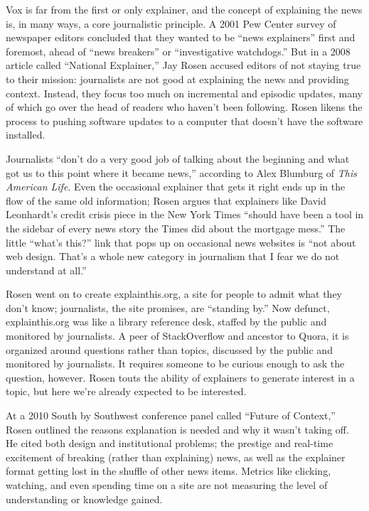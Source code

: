 Vox is far from the first or only explainer, and the concept of explaining the news is, in many ways, a core journalistic principle. A 2001 Pew Center survey of newspaper editors concluded that they wanted to be ``news explainers'' first and foremost, ahead of ``news breakers'' or ``investigative watchdogs.''\autocite{} But in a 2008 article called ``National Explainer,'' Jay Rosen accused editors of not staying true to their mission: journalists are not good at explaining the news and providing context.\autocite{} Instead, they focus too much on incremental and episodic updates, many of which go over the head of readers who haven't been following. Rosen likens the process to pushing software updates to a computer that doesn't have the software installed.

Journalists ``don’t do a very good job of talking about the beginning and what got us to this point where it became news,'' according to Alex Blumburg of \emph{This American Life}. Even the occasional explainer that gets it right ends up in the flow of the same old information; Rosen argues that explainers like David Leonhardt's credit crisis piece in the New York Times ``should have been a tool in the sidebar of every news story the Times did about the mortgage mess.'' The little ``what's this?'' link that pops up on occasional news websites is ``not about web design. That's a whole new category in journalism that I fear we do not understand at all.''

Rosen went on to create explainthis.org, a site for people to admit what they don't know; journalists, the site promises, are ``standing by.''\autocite{} Now defunct, explainthis.org was like a library reference desk, staffed by the public and monitored by journalists. A peer of StackOverflow and ancestor to Quora, it is organized around questions rather than topics, discussed by the public and monitored by journalists. It requires someone to be curious enough to ask the question, however. Rosen touts the ability of explainers to generate interest in a topic, but here we're already expected to be interested.

At a 2010 South by Southwest conference panel called ``Future of Context,'' Rosen outlined the reasons explanation is needed and why it wasn't taking off. He cited both design and institutional problems; the prestige and real-time excitement of breaking (rather than explaining) news, as well as the explainer format getting lost in the shuffle of other news items.\autocite{rosen_2010} Metrics like clicking, watching, and even spending time on a site are not measuring the level of understanding or knowledge gained.


